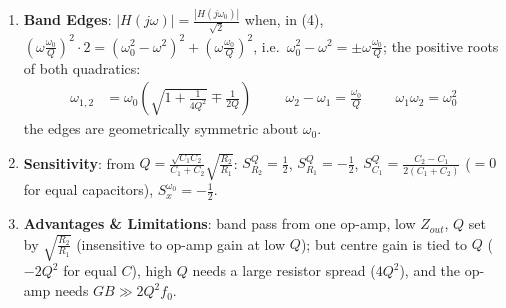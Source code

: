 \begin{enumerate}
    \paragraph{At Input:} \(I_{in} = (V_{in} - V_x) G_1\), with \(V_x\) from (1) and (3):
    \begin{align*}
      Z_{in}(s) &= \frac{s^2 C_1 C_2 + s G_2 (C_1 + C_2) + G_1 G_2}{G_1 s\left(s C_1 C_2 + G_2 (C_1 + C_2)\right)}
    \end{align*}
    \(s \to 0\): \(Z_{in} \to \infty\) (no DC path). \(s = j\omega_0\): numerator \(= j\omega_0 G_2 (C_1 + C_2)\) and
    \(G_2 (C_1 + C_2) = \frac{\omega_0 C_1 C_2}{Q}\) [from \(\frac{\omega_0}{Q}\)]:
    \begin{align*}
      Z_{in}(j\omega_0) &= \frac{G_2 (C_1 + C_2)}{G_1 \left(j\omega_0 C_1 C_2 + G_2 (C_1 + C_2)\right)} = \frac{\frac{\omega_0 C_1 C_2}{Q}}{G_1 \omega_0 C_1 C_2 \left(j + \frac{1}{Q}\right)} = \frac{R_1}{1 + jQ}
    \end{align*}
    \paragraph{At Output:} the op-amp output, \(Z_{out} = \frac{R_o}{1 + AF} \approx 0\) (Section~\ref{sec:amp_inverting}).
  \item \textbf{Band Edges}: \(|H(j\omega)| = \frac{|H(j\omega_0)|}{\sqrt{2}}\) when, in (4), \(\left(\omega\frac{\omega_0}{Q}\right)^2 \cdot 2 = (\omega_0^2 - \omega^2)^2 + \left(\omega\frac{\omega_0}{Q}\right)^2\),
    i.e.\ \(\omega_0^2 - \omega^2 = \pm\omega\frac{\omega_0}{Q}\); the positive roots of both quadratics:
    \begin{align*}
      \omega_{1,2} &= \omega_0\left(\sqrt{1 + \frac{1}{4Q^2}} \mp \frac{1}{2Q}\right) \hspace{1cm} \omega_2 - \omega_1 = \frac{\omega_0}{Q} \hspace{1cm} \omega_1\omega_2 = \omega_0^2
    \end{align*}
    the edges are geometrically symmetric about \(\omega_0\).
  \item \textbf{Sensitivity}: from \(Q = \frac{\sqrt{C_1C_2}}{C_1 + C_2}\sqrt{\frac{R_2}{R_1}}\): \(S_{R_2}^Q = \frac{1}{2}\), \(S_{R_1}^Q = -\frac{1}{2}\),
    \(S_{C_1}^Q = \frac{C_2 - C_1}{2(C_1 + C_2)}\) (\(= 0\) for equal capacitors), \(S_x^{\omega_0} = -\frac{1}{2}\).
  \item \textbf{Advantages \& Limitations}: band pass from one op-amp, low \(Z_{out}\), \(Q\) set by
    \(\sqrt{\frac{R_2}{R_1}}\) (insensitive to op-amp gain at low \(Q\)); but centre gain is tied to \(Q\)
    (\(-2Q^2\) for equal \(C\)), high \(Q\) needs a large resistor spread (\(4Q^2\)), and the op-amp needs
    \(GB \gg 2Q^2 f_0\).
\end{enumerate}


